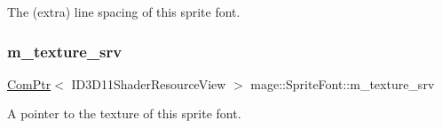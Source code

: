 The (extra) line spacing of this sprite font. \hypertarget{classmage_1_1_sprite_font_a0f52f8845cb204d4ca3b3f3020df0029}{}\label{classmage_1_1_sprite_font_a0f52f8845cb204d4ca3b3f3020df0029} 
\subsubsection{\texorpdfstring{m\+\_\+texture\+\_\+srv}{m\_texture\_srv}}
{\footnotesize\ttfamily \hyperlink{namespacemage_ae74f374780900893caa5555d1031fd79}{Com\+Ptr}$<$ I\+D3\+D11\+Shader\+Resource\+View $>$ mage\+::\+Sprite\+Font\+::m\+\_\+texture\+\_\+srv\hspace{0.3cm}{\ttfamily [private]}}

A pointer to the texture of this sprite font. 